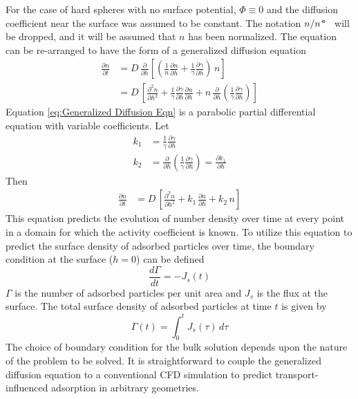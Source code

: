 For the case of hard spheres with no surface potential, $\Phi\equiv0$
and the diffusion coefficient near the surface was assumed to be constant.
The notation \(n  / n^\standardstate\) will be dropped, and it will
be assumed that $n$ has been normalized. The equation can be re-arranged
to have the form of a generalized diffusion equation\begin{align}
\frac{\partial n}{\partial t} & =D\,\frac{\partial}{\partial h}\left[\left(\frac{1}{n}\frac{\partial n}{\partial h}+\frac{1}{\gamma}\frac{\partial\gamma}{\partial h}\right)\, n\right]\nonumber \\
 & =D\,\left[\frac{\partial^{2}n}{\partial h^{2}}+\frac{1}{\gamma}\frac{\partial\gamma}{\partial h}\frac{\partial n}{\partial h}+n\,\frac{\partial}{\partial h}\left(\frac{1}{\gamma}\frac{\partial\gamma}{\partial h}\right)\right]\label{eq:Generalized Diffusion Eqn}\end{align}
Equation \ref{eq:Generalized Diffusion Eqn} is a parabolic partial
differential equation with variable coefficients. Let\begin{align}
k_{1} & =\frac{1}{\gamma}\frac{\partial\gamma}{\partial h}\nonumber \\
k_{2} & =\frac{\partial}{\partial h}\left(\frac{1}{\gamma}\frac{\partial\gamma}{\partial h}\right)=\frac{\partial k_{1}}{\partial h}\label{eq:Variable coefficients}\end{align}
Then\begin{align}
\frac{\partial n}{\partial t} & =D\,\left[\frac{\partial^{2}n}{\partial h^{2}}+k_{1\,}\frac{\partial n}{\partial h}+k_{2}\, n\right]\label{eq:Generalized Diffusion Eqn 1D}\end{align}
 This equation predicts the evolution of number density over time
at every point in a domain for which the activity coefficient is known.
To utilize this equation to predict the surface density of adsorbed
particles over time, the boundary condition at the surface ($h=0$)
can be defined\begin{equation}
\frac{d\Gamma}{dt}=-J_{s}\left(t\right)\label{eq:Flux matching BC}\end{equation}
$\Gamma$ is the number of adsorbed particles per unit area and $J_{s}$
is the flux at the surface. The total surface density of adsorbed
particles at time $t$ is given by\begin{equation}
\Gamma\left(t\right)=\int_{0}^{t}J_{s}\left(\tau\right)\, d\tau\label{eq:Total surface density}\end{equation}
The choice of boundary condition for the bulk solution depends upon
the nature of the problem to be solved. It is straightforward to couple
the generalized diffusion equation to a conventional CFD simulation
to predict transport-influenced adsorption in arbitrary geometries. 


